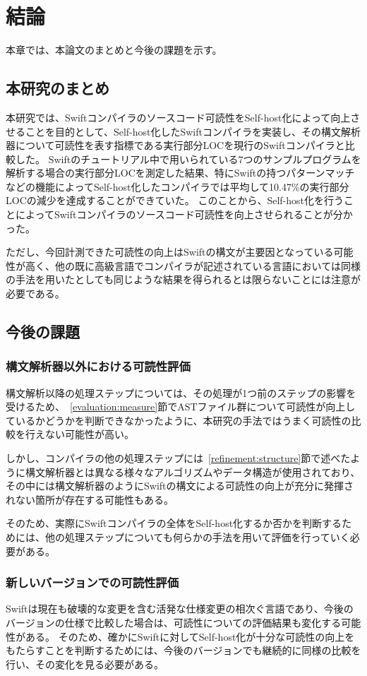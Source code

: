 \chapter{結論}
\label{conclusion}

本章では、本論文のまとめと今後の課題を示す。

\section{本研究のまとめ}

本研究では、Swiftコンパイラのソースコード可読性をSelf-host化によって向上させることを目的として、Self-host化したSwiftコンパイラを実装し、その構文解析器について可読性を表す指標である実行部分LOCを現行のSwiftコンパイラと比較した。
Swiftのチュートリアル中で用いられている7つのサンプルプログラムを解析する場合の実行部分LOCを測定した結果、特にSwiftの持つパターンマッチなどの機能によってSelf-host化したコンパイラでは平均して10.47\%の実行部分LOCの減少を達成することができていた。
このことから、Self-host化を行うことによってSwiftコンパイラのソースコード可読性を向上させられることが分かった。

ただし、今回計測できた可読性の向上はSwiftの構文が主要因となっている可能性が高く、他の既に高級言語でコンパイラが記述されている言語においては同様の手法を用いたとしても同じような結果を得られるとは限らないことには注意が必要である。

\section{今後の課題}

\subsection{構文解析器以外における可読性評価}

構文解析以降の処理ステップについては、その処理が1つ前のステップの影響を受けるため、~\ref{evaluation:measure}節でASTファイル群について可読性が向上しているかどうかを判断できなかったように、本研究の手法ではうまく可読性の比較を行えない可能性が高い。

しかし、コンパイラの他の処理ステップには~\ref{refinement:structure}節で述べたように構文解析器とは異なる様々なアルゴリズムやデータ構造が使用されており、その中には構文解析器のようにSwiftの構文による可読性の向上が充分に発揮されない箇所が存在する可能性もある。

そのため、実際にSwiftコンパイラの全体をSelf-host化するか否かを判断するためには、他の処理ステップについても何らかの手法を用いて評価を行っていく必要がある。

\subsection{新しいバージョンでの可読性評価}

Swiftは現在も破壊的な変更を含む活発な仕様変更の相次ぐ言語であり、今後のバージョンの仕様で比較した場合は、可読性についての評価結果も変化する可能性がある。
そのため、確かにSwiftに対してSelf-host化が十分な可読性の向上をもたらすことを判断するためには、今後のバージョンでも継続的に同様の比較を行い、その変化を見る必要がある。

